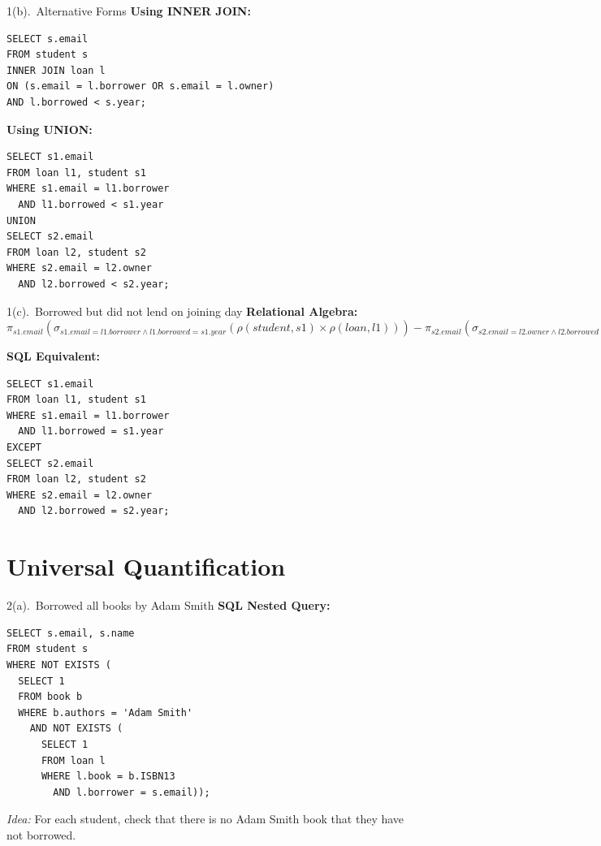 \documentclass{beamer}
\begin{document}
\begin{frame}[fragile]{1(b).\ Alternative Forms}
\textbf{Using INNER JOIN:}
\begin{lstlisting}
SELECT s.email
FROM student s
INNER JOIN loan l
ON (s.email = l.borrower OR s.email = l.owner)
AND l.borrowed < s.year;
\end{lstlisting}

\textbf{Using UNION:}
\begin{lstlisting}
SELECT s1.email
FROM loan l1, student s1
WHERE s1.email = l1.borrower
  AND l1.borrowed < s1.year
UNION
SELECT s2.email
FROM loan l2, student s2
WHERE s2.email = l2.owner
  AND l2.borrowed < s2.year;
\end{lstlisting}
\end{frame}

\begin{frame}[fragile]{1(c).\ Borrowed but did not lend on joining day}
\textbf{Relational Algebra:}\\
$
\pi_{s1.email}(\sigma_{s1.email=l1.borrower \wedge l1.borrowed=s1.year}
(\rho(student,s1)\times\rho(loan,l1)))
-
\pi_{s2.email}(\sigma_{s2.email=l2.owner \wedge l2.borrowed=s2.year}
(\rho(student,s2)\times\rho(loan,l2)))
$

\textbf{SQL Equivalent:}
\begin{lstlisting}
SELECT s1.email
FROM loan l1, student s1
WHERE s1.email = l1.borrower
  AND l1.borrowed = s1.year
EXCEPT
SELECT s2.email
FROM loan l2, student s2
WHERE s2.email = l2.owner
  AND l2.borrowed = s2.year;
\end{lstlisting}
\end{frame}

\section{Universal Quantification}

\begin{frame}[fragile]{2(a).\ Borrowed all books by Adam Smith}
\textbf{SQL Nested Query:}
\begin{lstlisting}
SELECT s.email, s.name
FROM student s
WHERE NOT EXISTS (
  SELECT 1
  FROM book b
  WHERE b.authors = 'Adam Smith'
    AND NOT EXISTS (
      SELECT 1
      FROM loan l
      WHERE l.book = b.ISBN13
        AND l.borrower = s.email));
\end{lstlisting}
\textit{Idea:} For each student, check that there is no Adam Smith book that they have not borrowed.
\end{frame}
\end{document}
